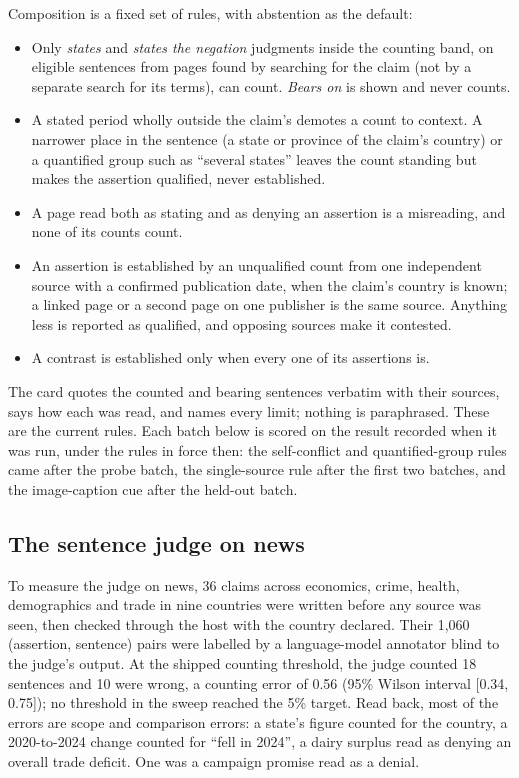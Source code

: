 \documentclass[11pt]{article}
\begin{document}
Composition is a fixed set of rules, with abstention as the default:
\begin{itemize}
  \item Only \emph{states} and \emph{states the negation} judgments inside the counting band, on eligible
        sentences from pages found by searching for the claim (not by a separate search for its terms),
        can count. \emph{Bears on} is shown and never counts.
  \item A stated period wholly outside the claim's demotes a count to context. A narrower place in the
        sentence (a state or province of the claim's country) or a quantified group such as ``several
        states'' leaves the count standing but makes the assertion qualified, never established.
  \item A page read both as stating and as denying an assertion is a misreading, and none of its counts count.
  \item An assertion is established by an unqualified count from one independent source with a confirmed
        publication date, when the claim's country is known; a linked page or a second page on one publisher
        is the same source. Anything less is reported as qualified, and opposing sources make it contested.
  \item A contrast is established only when every one of its assertions is.
\end{itemize}
The card quotes the counted and bearing sentences verbatim with their sources, says how each was read, and
names every limit; nothing is paraphrased. These are the current rules. Each batch below is scored on the
result recorded when it was run, under the rules in force then: the self-conflict and quantified-group rules
came after the probe batch, the single-source rule after the first two batches, and the image-caption cue
after the held-out batch.

\subsection{The sentence judge on news}

To measure the judge on news, 36 claims across economics, crime, health, demographics and trade in nine
countries were written before any source was seen, then checked through the host with the country declared.
Their 1,060 (assertion, sentence) pairs were labelled by a language-model annotator blind to the judge's
output. At the shipped counting threshold, the judge counted 18 sentences and 10 were wrong, a counting
error of 0.56 (95\% Wilson interval [0.34, 0.75]); no threshold in the sweep reached the 5\% target. Read
back, most of the errors are scope and comparison errors: a state's figure counted for the country, a
2020-to-2024 change counted for ``fell in 2024'', a dairy surplus read as denying an overall trade
deficit. One was a campaign promise read as a denial.
\end{document}
